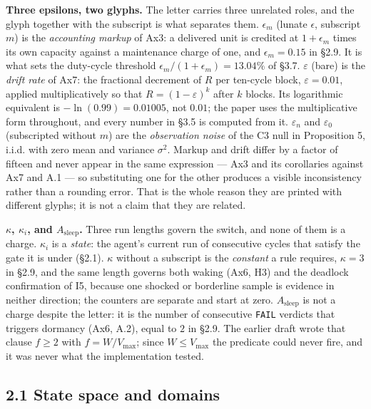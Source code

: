 \documentclass[11pt,a4paper]{article}
\newcounter{none}
\begin{document}
\textbf{Three epsilons, two glyphs.} The letter carries three unrelated roles, and the
glyph together with the subscript is what separates them. \(\epsilon_m\) (lunate
\(\epsilon\), subscript \(m\)) is the \emph{accounting markup} of Ax3: a delivered unit is
credited at \(1+\epsilon_m\) times its own capacity against a maintenance charge of
one, and \(\epsilon_m=0.15\) in §2.9. It is what sets the duty-cycle threshold
\(\epsilon_m/(1+\epsilon_m)=13.04\%\) of §3.7. \(\varepsilon\) (bare) is the \emph{drift rate} of Ax7: the fractional decrement of \(R\)
per ten-cycle block, \(\varepsilon=0.01\), applied multiplicatively so that
\(R=(1-\varepsilon)^{k}\) after \(k\) blocks. Its logarithmic equivalent is
\(-\ln(0.99)=0.01005\), not \(0.01\); the paper uses the multiplicative form
throughout, and every number in §3.5 is computed from it.
\(\varepsilon_n\) and \(\varepsilon_0\) (subscripted without \(m\)) are the
\emph{observation noise} of the C3 null in Proposition 5, i.i.d. with zero mean and
variance \(\sigma^2\). Markup and drift differ by a factor of fifteen and never
appear in the same expression --- Ax3 and its corollaries against Ax7 and A.1 ---
so substituting one for the other produces a visible inconsistency rather than a
rounding error. That is the whole reason they are printed with different glyphs;
it is not a claim that they are related.

\textbf{\(\kappa\), \(\kappa_i\), and \(A_{\mathrm{sleep}}\).} Three run lengths govern the
switch, and none of them is a charge. \(\kappa_i\) is a \emph{state}: the agent's
current run of consecutive cycles that satisfy the gate it is under (§2.1).
\(\kappa\) without a subscript is the \emph{constant} a rule requires, \(\kappa=3\) in
§2.9, and the same length governs both waking (Ax6, H3) and the deadlock
confirmation of I5, because one shocked or borderline sample is evidence in
neither direction; the counters are separate and start at zero.
\(A_{\mathrm{sleep}}\) is not a charge despite the letter: it is the number of
consecutive \texttt{FAIL} verdicts that triggers dormancy (Ax6, A.2), equal to \(2\) in
§2.9. The earlier draft wrote that clause \(f\ge2\) with \(f=W/V_{\max}\); since
\(W\le V_{\max}\) the predicate could never fire, and it was never what the
implementation tested.

\subsection{2.1 State space and domains}\label{state-space-and-domains}
\end{document}
